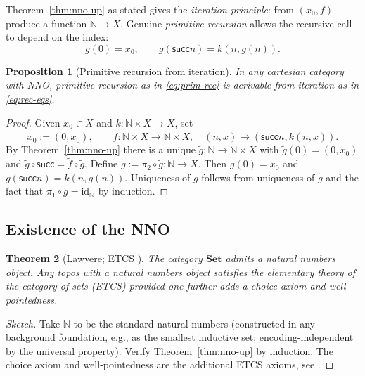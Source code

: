 \documentclass[12pt]{article}
\newtheorem{theorem}{Theorem}[section]
\newtheorem{proposition}[theorem]{Proposition}
\theoremstyle{definition}
\theoremstyle{remark}
\newcommand{\N}{\mathbb{N}}
\newcommand{\Set}{\mathbf{Set}}
\newcommand{\id}{\mathrm{id}}
\newcommand{\suc}{\mathsf{succ}}
\begin{document}
Theorem~\ref{thm:nno-up} as stated gives the \emph{iteration principle}: from $(x_0, f)$ produce a function $\N \to X$. Genuine \emph{primitive recursion} allows the recursive call to depend on the index:
\begin{equation}
g(0) = x_0, \qquad g(\suc n) = k(n, g(n)).
\label{eq:prim-rec}
\end{equation}

\begin{proposition}[Primitive recursion from iteration]
\label{prop:prim-rec}
In any cartesian category with NNO, primitive recursion as in \eqref{eq:prim-rec} is derivable from iteration as in \eqref{eq:rec-eqs}.
\end{proposition}

\begin{proof}
Given $x_0 \in X$ and $k \colon \N \times X \to X$, set
\[
\widetilde{x}_0 := (0, x_0), \qquad \widetilde{f} \colon \N \times X \to \N \times X, \quad (n, x) \mapsto (\suc n, k(n, x)).
\]
By Theorem~\ref{thm:nno-up} there is a unique $\widetilde{g} \colon \N \to \N \times X$ with $\widetilde{g}(0) = (0, x_0)$ and $\widetilde{g} \circ \suc = \widetilde{f} \circ \widetilde{g}$. Define $g := \pi_2 \circ \widetilde{g} \colon \N \to X$. Then $g(0) = x_0$ and $g(\suc n) = k(n, g(n))$. Uniqueness of $g$ follows from uniqueness of $\widetilde{g}$ and the fact that $\pi_1 \circ \widetilde{g} = \id_\N$ by induction.
\end{proof}

\subsection{Existence of the NNO}

\begin{theorem}[Lawvere; ETCS \cite{Lawvere1964}]
\label{thm:etcs}
The category $\Set$ admits a natural numbers object. Any topos with a natural numbers object satisfies the elementary theory of the category of sets (ETCS) provided one further adds a choice axiom and well-pointedness.
\end{theorem}

\begin{proof}[Sketch]
Take $\N$ to be the standard natural numbers (constructed in any background foundation, e.g., as the smallest inductive set; encoding-independent by the universal property). Verify Theorem~\ref{thm:nno-up} by induction. The choice axiom and well-pointedness are the additional ETCS axioms, see \cite{Lawvere1964,LawvereRosebrugh2003}.
\end{proof}
\end{document}
